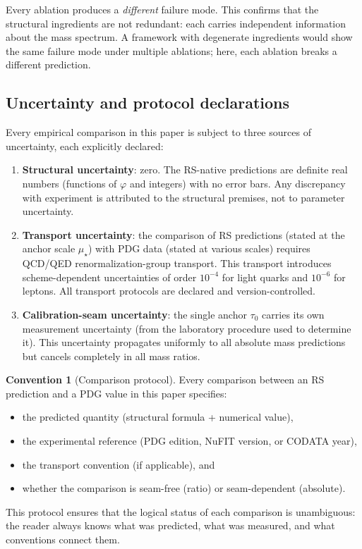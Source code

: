 \documentclass[11pt,a4paper]{article}
\theoremstyle{definition}
\newtheorem{convention}[theorem]{Convention}
\theoremstyle{remark}
\newcommand{\phig}{\varphi}
\newcommand{\muStar}{\mu_{\star}}
\begin{document}
\noindent
Every ablation produces a \emph{different} failure mode.  This confirms that
the structural ingredients are not redundant: each carries independent
information about the mass spectrum.  A framework with degenerate ingredients
would show the same failure mode under multiple ablations; here, each
ablation breaks a different prediction.

\subsection{Uncertainty and protocol declarations}

Every empirical comparison in this paper is subject to three sources of
uncertainty, each explicitly declared:

\begin{enumerate}[nosep]
  \item \textbf{Structural uncertainty}: zero.  The RS-native predictions are
    definite real numbers (functions of $\phig$ and integers) with no error
    bars.  Any discrepancy with experiment is attributed to the structural
    premises, not to parameter uncertainty.

  \item \textbf{Transport uncertainty}: the comparison of RS predictions
    (stated at the anchor scale $\muStar$) with PDG data (stated at various
    scales) requires QCD/QED renormalization-group transport.  This transport
    introduces scheme-dependent uncertainties of order $10^{-4}$ for light
    quarks and $10^{-6}$ for leptons.  All transport protocols are declared
    and version-controlled.

  \item \textbf{Calibration-seam uncertainty}: the single anchor $\tau_0$
    carries its own measurement uncertainty (from the laboratory procedure
    used to determine it).  This uncertainty propagates uniformly to all
    absolute mass predictions but cancels completely in all mass ratios.
\end{enumerate}

\begin{convention}[Comparison protocol]
\label{conv:comparison}
Every comparison between an RS prediction and a PDG value in this paper
specifies:
\begin{itemize}[nosep]
  \item the predicted quantity (structural formula + numerical value),
  \item the experimental reference (PDG edition, NuFIT version, or CODATA year),
  \item the transport convention (if applicable), and
  \item whether the comparison is seam-free (ratio) or seam-dependent (absolute).
\end{itemize}
This protocol ensures that the logical status of each comparison is
unambiguous: the reader always knows what was predicted, what was measured,
and what conventions connect them.
\end{convention}
\end{document}
